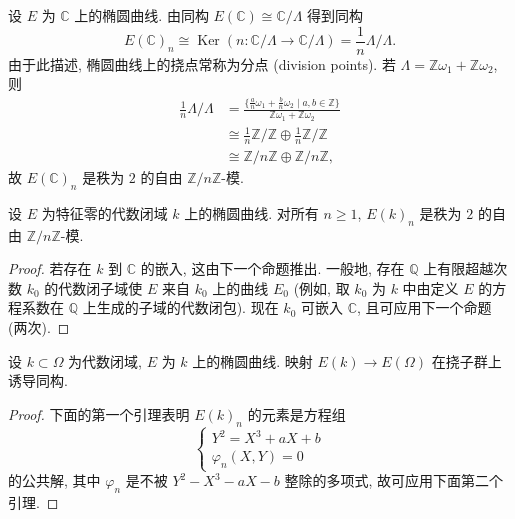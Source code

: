 设 $E$ 为 $\mathbb{C}$ 上的椭圆曲线. 由同构 $E(\mathbb{C})\cong\mathbb{C}/\Lambda$ 得到同构
\[
E(\mathbb{C})_n \cong \operatorname{Ker}(n\colon\mathbb{C}/\Lambda\to\mathbb{C}/\Lambda) = \frac{1}{n}\Lambda/\Lambda.
\]
由于此描述, 椭圆曲线上的挠点常称为分点 (division points). 若 $\Lambda = \mathbb{Z}\omega_1 + \mathbb{Z}\omega_2$, 则
\[
\begin{aligned}
\frac{1}{n}\Lambda/\Lambda
&= \frac{\{\frac{a}{n}\omega_1 + \frac{b}{n}\omega_2 \mid a,b\in\mathbb{Z}\}}{\mathbb{Z}\omega_1 + \mathbb{Z}\omega_2}\\
&\cong \frac{1}{n}\mathbb{Z}/\mathbb{Z}\oplus\frac{1}{n}\mathbb{Z}/\mathbb{Z}\\
&\cong \mathbb{Z}/n\mathbb{Z}\oplus\mathbb{Z}/n\mathbb{Z},
\end{aligned}
\]
故 $E(\mathbb{C})_n$ 是秩为 $2$ 的自由 $\mathbb{Z}/n\mathbb{Z}$-模.

\begin{theorem} \label{thm:3.3.12} 
设 $E$ 为特征零的代数闭域 $k$ 上的椭圆曲线. 对所有 $n\ge 1$, $E(k)_n$ 是秩为 $2$ 的自由 $\mathbb{Z}/n\mathbb{Z}$-模.
\end{theorem}

\begin{proof}
若存在 $k$ 到 $\mathbb{C}$ 的嵌入, 这由下一个命题推出. 一般地, 存在 $\mathbb{Q}$ 上有限超越次数 $k_0$ 的代数闭子域使 $E$ 来自 $k_0$ 上的曲线 $E_0$ (例如, 取 $k_0$ 为 $k$ 中由定义 $E$ 的方程系数在 $\mathbb{Q}$ 上生成的子域的代数闭包). 现在 $k_0$ 可嵌入 $\mathbb{C}$, 且可应用下一个命题 (两次).
\end{proof}

\begin{proposition} \label{thm:3.3.13} 
设 $k\subset\Omega$ 为代数闭域, $E$ 为 $k$ 上的椭圆曲线. 映射 $E(k)\to E(\Omega)$ 在挠子群上诱导同构.
\end{proposition}

\begin{proof}
下面的第一个引理表明 $E(k)_n$ 的元素是方程组
\[
\begin{cases}
Y^2 = X^3 + aX + b\\
\varphi_n(X, Y) = 0
\end{cases}
\]
的公共解, 其中 $\varphi_n$ 是不被 $Y^2 - X^3 - aX - b$ 整除的多项式, 故可应用下面第二个引理.
\end{proof}

